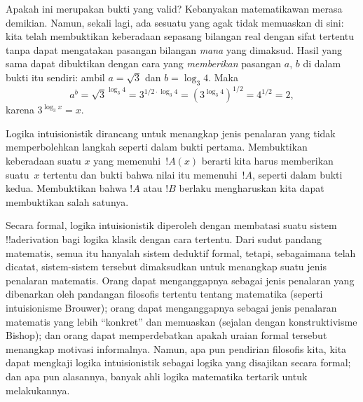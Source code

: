 \documentclass[../../../include/open-logic-chapter]{subfiles}
\begin{document}
Apakah ini merupakan bukti yang valid? Kebanyakan matematikawan merasa
demikian. Namun, sekali lagi, ada sesuatu yang agak tidak memuaskan di sini:
kita telah membuktikan keberadaan sepasang bilangan real dengan sifat tertentu
tanpa dapat mengatakan pasangan bilangan \emph{mana} yang dimaksud. Hasil yang
sama dapat dibuktikan dengan cara yang \emph{memberikan} pasangan $a$, $b$ di
dalam bukti itu sendiri: ambil $a = \sqrt{3}$ dan $b = \log_3 4$. Maka
\[
a^b = \sqrt{3}^{\log_3 4} = 3^{1/2 \cdot \log_3 4} = (3^{\log_3
  4})^{1/2} = 4^{1/2}= 2,
\]
karena $3^{\log_3 x} = x$.

Logika intuisionistik dirancang untuk menangkap jenis penalaran yang tidak
memperbolehkan langkah seperti dalam bukti pertama. Membuktikan keberadaan
suatu $x$ yang memenuhi~$!A(x)$ berarti kita harus memberikan suatu~$x$
tertentu dan bukti bahwa nilai itu memenuhi~$!A$, seperti dalam bukti kedua.
Membuktikan bahwa $!A$ atau $!B$ berlaku mengharuskan kita dapat membuktikan
salah satunya.

Secara formal, logika intuisionistik diperoleh dengan membatasi suatu sistem
!!a{derivation} bagi logika klasik dengan cara tertentu. Dari sudut pandang
matematis, semua itu hanyalah sistem deduktif formal, tetapi, sebagaimana telah
dicatat, sistem-sistem tersebut dimaksudkan untuk menangkap suatu jenis
penalaran matematis. Orang dapat menganggapnya sebagai jenis penalaran yang
dibenarkan oleh pandangan filosofis tertentu tentang matematika (seperti
intuisionisme Brouwer); orang dapat menganggapnya sebagai jenis penalaran
matematis yang lebih ``konkret'' dan memuaskan (sejalan dengan konstruktivisme
Bishop); dan orang dapat memperdebatkan apakah uraian formal tersebut
menangkap motivasi informalnya. Namun, apa pun pendirian filosofis kita, kita
dapat mengkaji logika intuisionistik sebagai logika yang disajikan secara
formal; dan apa pun alasannya, banyak ahli logika matematika tertarik untuk
melakukannya.
\end{document}
